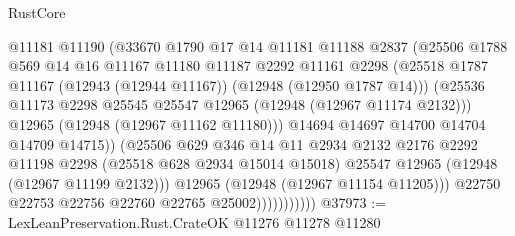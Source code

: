 \begin{lexlean}{RustCore}
\begin{coremodule}
                              @11181
                              @11190
                              (@33670
                                @1790
                                @17
                                @14
                                @11181
                                @11188
                                @2837
                                (@25506
                                  @1788
                                  @569
                                  @14
                                  @16
                                  @11167
                                  @11180
                                  @11187
                                  @2292
                                  @11161
                                  @2298
                                  (@25518
                                    @1787
                                    @11167
                                    (@12943 (@12944 @11167))
                                    (@12948 (@12950 @1787 @14)))
                                  (@25536
                                    @11173
                                    @2298
                                    @25545
                                    @25547
                                    @12965
                                    (@12948 (@12967 @11174 @2132)))
                                  @12965
                                  (@12948 (@12967 @11162 @11180)))
                                @14694
                                @14697
                                @14700
                                @14704
                                @14709
                                @14715))
                            (@25506
                              @629
                              @346
                              @14
                              @11
                              @2934
                              @2132
                              @2176
                              @2292
                              @11198
                              @2298
                              (@25518 @628 @2934 @15014 @15018)
                              @25547
                              @12965
                              (@12948 (@12967 @11199 @2132)))
                            @12965
                            (@12948 (@12967 @11154 @11205)))
                          @22750
                          @22753
                          @22756
                          @22760
                          @22765
                          @25002)))))))))))
@37973 := LexLeanPreservation.Rust.CrateOK @11276 @11278 @11280

\end{coremodule}
\end{lexlean}

